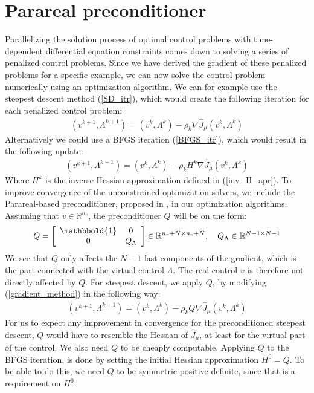 \section{Parareal preconditioner} \label{pc sec}
Parallelizing the solution process of optimal control problems with time-dependent differential equation constraints comes down to solving a series of penalized control problems. Since we have derived the gradient of these penalized problems for a specific example, we can now solve the control problem numerically using an optimization algorithm. We can for example use the steepest descent method (\ref{SD_itr}), which would create the following iteration for each penalized control problem:
\begin{align}
(v^{k+1},\Lambda^{k+1}) = (v^{k},\Lambda^{k}) -\rho_k\nabla\hat{J}_{\mu}(v^{k},\Lambda^{k}) \label{gradient_method}
\end{align}
Alternatively we could use a BFGS iteration (\ref{BFGS_itr}), which would result in the following update:
\begin{align}
(v^{k+1},\Lambda^{k+1}) = (v^{k},\Lambda^{k}) -\rho_kH^{k}\nabla\hat{J}_{\mu}(v^{k},\Lambda^{k}) \label{bfgs_method}
\end{align}
Where $H^k$ is the inverse Hessian approximation defined in (\ref{inv_H_apr}). To improve convergence of the unconstrained optimization solvers, we include the Parareal-based preconditioner, proposed in \cite{maday2002parareal}, in our optimization algorithms. Assuming that $v\in\mathbb{R}^{n_v}$, the preconditioner $Q$ will be on the form:
\begin{align}
Q = \left[ \begin{array}{cc}
	\mathbbold{1} & 0 \\
	0 & Q_{\Lambda} \\
	\end{array} \right]\in \mathbb{R}^{n_v+N\times n_v+N},\quad Q_{\Lambda}\in\mathbb{R}^{N-1\times N-1} \label{PC_form}
\end{align} 
We see that $Q$ only affects the $N-1$ last components of the gradient, which is the part connected with the virtual control $\Lambda$. The real control $v$ is therefore not directly affected by $Q$. For steepest descent, we apply $Q$, by modifying (\ref{gradient_method}) in the following way:
\begin{align}
(v^{k+1},\Lambda^{k+1}) = (v^{k},\Lambda^{k}) -\rho_kQ\nabla\hat{J}_{\mu}(v^{k},\Lambda^{k}) \label{gradient_method2}
\end{align}
For us to expect any improvement in convergence for the preconditioned steepest descent, $Q$ would have to resemble the Hessian of $\hat{J}_{\mu}$, at least for the virtual part of the control. We also need $Q$ to be cheaply computable. Applying $Q$ to the BFGS iteration, is done by setting the initial Hessian approximation $H^0=Q$. To be able to do this, we need $Q$ to be symmetric positive definite, since that is a requirement on $H^0$. 
